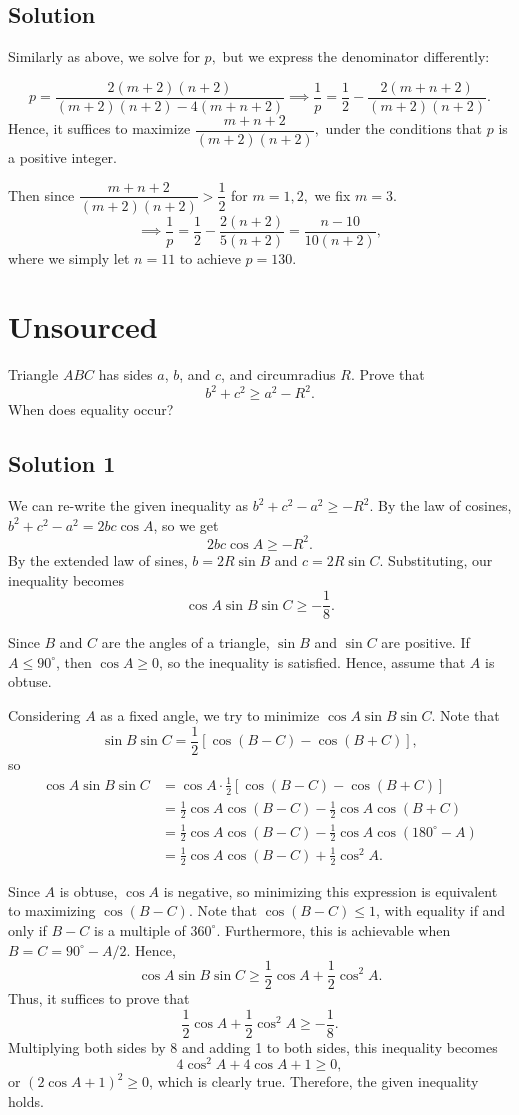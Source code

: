 \documentclass[mast]{lucky}
\begin{document}
\subsection{Solution}
Similarly as above, we solve for $p,$ but we express the denominator differently:

\[p=\dfrac{2(m+2)(n+2)}{(m+2)(n+2)-4(m+n+2)} \implies \dfrac{1}{p}=\dfrac{1}{2}-\dfrac{2(m+n+2)}{(m+2)(n+2)}.\]Hence, it suffices to maximize $\dfrac{m+n+2}{(m+2)(n+2)},$ under the conditions that $p$ is a positive integer.

Then since $\dfrac{m+n+2}{(m+2)(n+2)}>\dfrac{1}{2}$ for $m=1,2,$ we fix $m=3.$\[\implies \dfrac{1}{p}=\dfrac{1}{2}-\dfrac{2(n+2)}{5(n+2)}=\dfrac{n-10}{10(n+2)},\]where we simply let $n=11$ to achieve $p=\boxed{130}.$
\pagebreak\section{Unsourced}
Triangle $ABC$ has sides $a$, $b$, and $c$, and circumradius $R$. Prove that
\[b^2 + c^2 \ge a^2 - R^2.\]
When does equality occur?
\subsection{Solution 1}
We can re-write the given inequality as $b^2 + c^2 - a^2 \ge -R^2$. By the law of cosines, $b^2 + c^2 - a^2 = 2bc \cos A$, so we get
\[2bc \cos A \ge -R^2.\]
By the extended law of sines, $b = 2R \sin B$ and $c = 2R \sin C$. Substituting, our inequality becomes
\[\cos A \sin B \sin C \ge -\frac{1}{8}.\]

Since $B$ and $C$ are the angles of a triangle, $\sin B$ and $\sin C$ are positive. If $A \le 90^\circ$, then $\cos A \ge 0$, so the inequality is satisfied. Hence, assume that $A$ is obtuse.

Considering $A$ as a fixed angle, we try to minimize $\cos A \sin B \sin C$. Note that
\[\sin B \sin C = \frac{1}{2} [\cos (B - C) - \cos (B + C)],\]
so
\begin{align*}
\cos A \sin B \sin C &= \cos A \cdot \frac{1}{2} [\cos (B - C) - \cos (B + C)] \\
&= \frac{1}{2} \cos A \cos (B - C) - \frac{1}{2} \cos A \cos (B + C) \\
&= \frac{1}{2} \cos A \cos (B - C) - \frac{1}{2} \cos A \cos (180^\circ - A) \\
&= \frac{1}{2} \cos A \cos (B - C) + \frac{1}{2} \cos^2 A.
\end{align*}

Since $A$ is obtuse, $\cos A$ is negative, so minimizing this expression is equivalent to maximizing $\cos (B - C)$. Note that $\cos (B - C) \le 1$, with equality if and only if $B - C$ is a multiple of $360^\circ$. Furthermore, this is achievable when $B = C = 90^\circ - A/2$. Hence,
\[\cos A \sin B \sin C \ge \frac{1}{2} \cos A + \frac{1}{2} \cos^2 A.\]
Thus, it suffices to prove that
\[\frac{1}{2} \cos A + \frac{1}{2} \cos^2 A \ge -\frac{1}{8}.\]
Multiplying both sides by 8 and adding 1 to both sides, this inequality becomes
\[4 \cos^2 A + 4 \cos A + 1 \ge 0,\]
or $(2 \cos A + 1)^2 \ge 0$, which is clearly true. Therefore, the given inequality holds.
\end{document}
